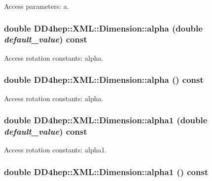 Access parameters: a. \hypertarget{struct_d_d4hep_1_1_x_m_l_1_1_dimension_a9e86bf7a2672b84dd21107a5c5203bfe}{
\subsubsection[{alpha}]{\setlength{\rightskip}{0pt plus 5cm}double DD4hep::XML::Dimension::alpha (double {\em default\_\-value}) const}}
\label{struct_d_d4hep_1_1_x_m_l_1_1_dimension_a9e86bf7a2672b84dd21107a5c5203bfe}


Access rotation constants: alpha. \hypertarget{struct_d_d4hep_1_1_x_m_l_1_1_dimension_a41aad5c0a9e27d2c92b3097bf80b4a46}{
\subsubsection[{alpha}]{\setlength{\rightskip}{0pt plus 5cm}double DD4hep::XML::Dimension::alpha () const}}
\label{struct_d_d4hep_1_1_x_m_l_1_1_dimension_a41aad5c0a9e27d2c92b3097bf80b4a46}


Access rotation constants: alpha. \hypertarget{struct_d_d4hep_1_1_x_m_l_1_1_dimension_a597306d88616aa90ef5b3331f0941b3e}{
\subsubsection[{alpha1}]{\setlength{\rightskip}{0pt plus 5cm}double DD4hep::XML::Dimension::alpha1 (double {\em default\_\-value}) const}}
\label{struct_d_d4hep_1_1_x_m_l_1_1_dimension_a597306d88616aa90ef5b3331f0941b3e}


Access rotation constants: alpha1. \hypertarget{struct_d_d4hep_1_1_x_m_l_1_1_dimension_acf345f7cc4e5467c9a9f09a41b434361}{
\subsubsection[{alpha1}]{\setlength{\rightskip}{0pt plus 5cm}double DD4hep::XML::Dimension::alpha1 () const}}
\label{struct_d_d4hep_1_1_x_m_l_1_1_dimension_acf345f7cc4e5467c9a9f09a41b434361}



